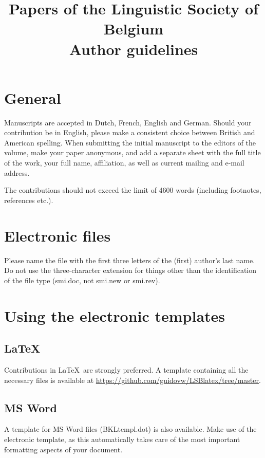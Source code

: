 \documentclass[times,linguex]{lsb}
\title[short title]{Papers of the Linguistic Society of Belgium\\ Author guidelines}
\author[Vanden Wyngaerd]%
{
\spauthor{Guido Vanden Wyngaerd \\ \institute{KU Leuven}} 
}
\begin{document}
\maketitle

\begin{abstract} \normalsize  \lipsum[1]
\end{abstract}

\clearpage

\section{General}

Manuscripts are accepted in Dutch, French, English and German. Should your contribution be in English, please make a consistent choice between British and American spelling. When submitting the initial manuscript to the editors of the volume, make your paper anonymous, and  add a separate sheet with the full title of the work, your full name, affiliation, as well as current mailing and e-mail address.

The contributions should not exceed the limit of 4600 words (including footnotes, references etc.). 

\section{Electronic files}

Please name the file with the first three letters of the (first) author’s last name. Do not use the three-character extension for things other than the identification of the file type (smi.doc, not smi.new or smi.rev). 

\section{Using the electronic templates}

\subsection{\LaTeX\ }
Contributions in \LaTeX\ are strongly preferred. A template containing all the necessary files is available at \url{https://github.com/guidovw/LSBlatex/tree/master}. 

\subsection{MS Word}

A template for MS Word files (BKLtempl.dot) is also available. Make use of the electronic template, as this automatically takes care of the most important formatting aspects of your document. 
\end{document}
